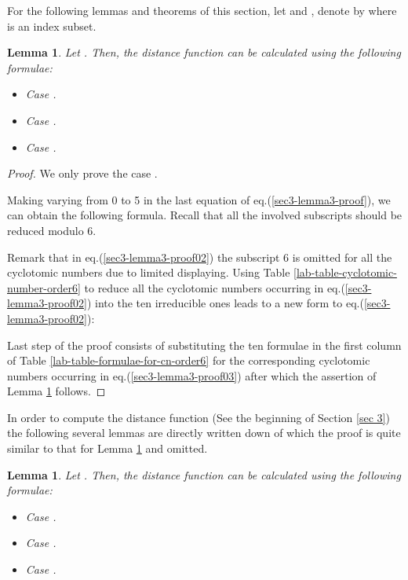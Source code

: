 \documentclass[letter]{ieice}
\newtheorem{sec3_lemma3}[sec3_lemma1]{Lemma}
\newtheorem{sec3_lemma4}[sec3_lemma1]{Lemma}
\begin{document}
  For the following lemmas and theorems of this section,  let  and , denote  by   where  is an index subset.

\begin{sec3_lemma3}\label{sec3-lamma3-label}
Let . Then, the distance function  can be calculated using the following formulae:
\begin{itemize}
\item Case .

\item Case .

\item Case .

\end{itemize}
\end{sec3_lemma3}               
 \begin{proof}
 We only prove the case .
 
Making varying  from 0 to 5 in the last equation of eq.(\ref{sec3-lemma3-proof}), we can obtain the following formula. Recall that all the involved subscripts should be reduced modulo 6.

Remark that in eq.(\ref{sec3-lemma3-proof02}) the subscript 6 is omitted for all the cyclotomic numbers due to limited displaying. Using Table \ref{lab-table-cyclotomic-number-order6} to reduce all the cyclotomic numbers occurring in eq.(\ref{sec3-lemma3-proof02}) into the ten irreducible ones leads to a new form to eq.(\ref{sec3-lemma3-proof02}):

Last step of the proof consists of substituting the ten formulae in the first column of Table \ref{lab-table-formulae-for-cn-order6} for the corresponding cyclotomic numbers occurring in eq.(\ref{sec3-lemma3-proof03}) after which the assertion of Lemma \ref{sec3-lamma3-label} follows.
 \end{proof} 
 
 In order to compute the distance function  (See the beginning of Section \ref{sec 3}) the following several lemmas are directly written down of which the proof is quite similar to that for Lemma \ref{sec3-lamma3-label} and omitted.
 
\begin{sec3_lemma4}\label{sec3-lamma4-label}
Let . Then, the distance function  can be calculated using the following formulae:
\begin{itemize}
\item Case .

\item Case .

\item Case .

\end{itemize}
\end{sec3_lemma4}            
\end{document}
